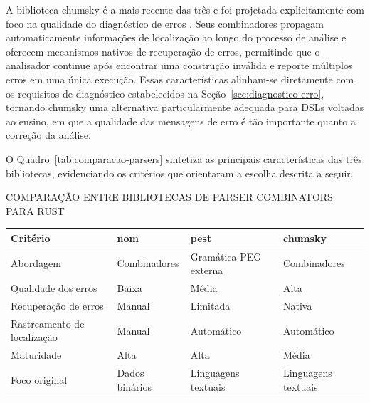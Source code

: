 \documentclass[
    12pt
    ,oneside
    ,a4paper
    ,chapter=TITLE
    ,section=TITLE
    ,sumario=abnt-6027-2012]{abntex2}
\begin{document}
A biblioteca chumsky é a mais recente das três e foi projetada explicitamente com foco
na qualidade do diagnóstico de erros \cite{chumsky2022}. Seus combinadores propagam
automaticamente informações de localização ao longo do processo de análise e oferecem
mecanismos nativos de recuperação de erros, permitindo que o analisador continue após encontrar
uma construção inválida e reporte múltiplos erros em uma única execução. Essas características
alinham-se diretamente com os requisitos de diagnóstico estabelecidos na
Seção~\ref{sec:diagnostico-erro}, tornando chumsky uma alternativa particularmente adequada
para DSLs voltadas ao ensino, em que a qualidade das mensagens de erro é tão importante quanto
a correção da análise.

O Quadro~\ref{tab:comparacao-parsers} sintetiza as principais características das três
bibliotecas, evidenciando os critérios que orientaram a escolha descrita a seguir.

\begin{quadro}[h]
    \centering
    \caption{COMPARAÇÃO ENTRE BIBLIOTECAS DE PARSER COMBINATORS PARA RUST}
    \label{tab:comparacao-parsers}
    \small
    \setlength{\tabcolsep}{5pt}
    \begin{tabularx}{\textwidth}{|l|Y|Y|Y|}
        \hline
        Critério              & nom       & pest         & chumsky       \\
        \hline
        Abordagem                      & Combinadores       & Gramática PEG externa & Combinadores           \\
        Qualidade dos erros            & Baixa              & Média                 & Alta                   \\
        Recuperação de erros           & Manual             & Limitada              & Nativa                 \\
        Rastreamento de localização    & Manual             & Automático            & Automático             \\
        Maturidade                     & Alta               & Alta                  & Média                  \\
        Foco original                  & Dados binários     & Linguagens textuais   & Linguagens textuais    \\
        \hline
    \end{tabularx}
\end{quadro}
\end{document}
